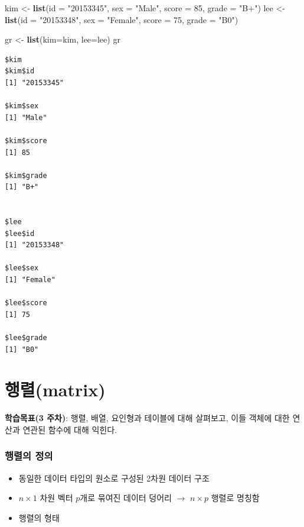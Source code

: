 \documentclass[
  11pt,
]{krantz}
\newenvironment{Shaded}{\begin{snugshade}}{\end{snugshade}}
\newcommand{\DataTypeTok}[1]{\textcolor[rgb]{0.27,0.27,0.27}{#1}}
\newcommand{\DecValTok}[1]{\textcolor[rgb]{0.06,0.06,0.06}{#1}}
\newcommand{\KeywordTok}[1]{\textcolor[rgb]{0.27,0.27,0.27}{\textbf{#1}}}
\newcommand{\NormalTok}[1]{#1}
\newcommand{\StringTok}[1]{\textcolor[rgb]{0.5,0.5,0.5}{#1}}
\providecommand{\tightlist}{%
  \setlength{\itemsep}{0pt}\setlength{\parskip}{0pt}}
\let\BeginKnitrBlock\begin \let\EndKnitrBlock\end
\begin{document}
\begin{Shaded}
\begin{Highlighting}[]
\NormalTok{kim <-}\StringTok{ }\KeywordTok{list}\NormalTok{(}\DataTypeTok{id =} \StringTok{"20153345"}\NormalTok{, }\DataTypeTok{sex =} \StringTok{"Male"}\NormalTok{, }\DataTypeTok{score =} \DecValTok{85}\NormalTok{, }\DataTypeTok{grade =} \StringTok{"B+"}\NormalTok{)}
\NormalTok{lee <-}\StringTok{ }\KeywordTok{list}\NormalTok{(}\DataTypeTok{id =} \StringTok{"20153348"}\NormalTok{, }\DataTypeTok{sex =} \StringTok{"Female"}\NormalTok{, }\DataTypeTok{score =} \DecValTok{75}\NormalTok{, }\DataTypeTok{grade =} \StringTok{"B0"}\NormalTok{)}

\NormalTok{gr <-}\StringTok{ }\KeywordTok{list}\NormalTok{(}\DataTypeTok{kim=}\NormalTok{kim, }\DataTypeTok{lee=}\NormalTok{lee)}
\NormalTok{gr}
\end{Highlighting}
\end{Shaded}

\begin{verbatim}
$kim
$kim$id
[1] "20153345"

$kim$sex
[1] "Male"

$kim$score
[1] 85

$kim$grade
[1] "B+"


$lee
$lee$id
[1] "20153348"

$lee$sex
[1] "Female"

$lee$score
[1] 75

$lee$grade
[1] "B0"
\end{verbatim}

\normalsize

\hypertarget{matrix}{%
\section{행렬(matrix)}\label{matrix}}

\footnotesize

\BeginKnitrBlock{rmdnote}
\textbf{학습목표(3 주차)}: 행렬, 배열, 요인형과 테이블에 대해 살펴보고, 이들 객체에 대한 연산과 연관된 함수에 대해 익힌다.
\EndKnitrBlock{rmdnote}

\normalsize

\hypertarget{def-matrix}{%
\subsubsection*{\texorpdfstring{\textbf{행렬의 정의}}{행렬의 정의}}\label{def-matrix}}


\begin{itemize}
\tightlist
\item
  동일한 데이터 타입의 원소로 구성된 2차원 데이터 구조
\item
  \(n \times 1\) 차원 벡터 \(p\)개로 묶여진 데이터 덩어리 \(\rightarrow\) \(n \times p\) 행렬로 명칭함
\item
  행렬의 형태
\end{itemize}
\end{document}
